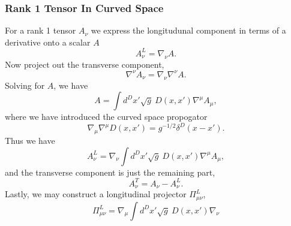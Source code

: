 \documentclass[10pt,letterpaper]{article}
\begin{document}
\subsubsection{Rank 1 Tensor In Curved Space}
For a rank 1 tensor $A_\nu$ we express the longitudunal component in terms of a derivative onto a scalar $A$
\begin{equation}
A_\nu^L = \nabla_\nu A.
\end{equation}
Now project out the transverse component, 
\begin{equation}
\nabla^\nu A_\nu = \nabla_\nu \nabla^\nu A.
\end{equation}
Solving for $A$, we have
\begin{equation}
A = \int d^Dx'\sqrt{g}\  D(x,x') \nabla^\mu A_\mu,
\end{equation}
where we have introduced the curved space propogator
\begin{equation}
\nabla_\mu \nabla^\mu D(x,x') = g^{-1/2} \delta^D(x-x').
\end{equation}
Thus we have
\begin{equation}
A_\nu^L = \nabla_\nu \int d^Dx'\sqrt{g}\ D(x,x') \nabla^\mu A_\mu,
\end{equation}
and the transverse component is just the remaining part,
\begin{equation}
A_\nu^T = A_\nu - A_\nu^L.
\end{equation}
Lastly, we may construct a longitudinal projector $\Pi_{\mu\nu}^L$,
\begin{equation}
\Pi_{\mu\nu}^L = \nabla_\mu \int d^Dx'\sqrt{g}\  D(x,x') \nabla_\nu
\end{equation}
\end{document}
